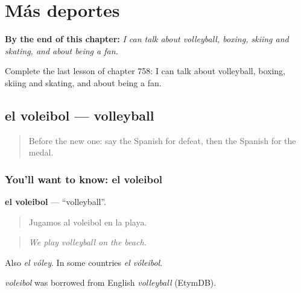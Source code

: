 
\chapter{Más deportes}
\label{ch:es-mas-deportes}

\begin{chapteropening}
\textbf{By the end of this chapter:} \emph{I can talk about volleyball, boxing, skiing and skating, and about being a fan.}

Complete the last lesson of chapter 758: I can talk about volleyball, boxing, skiing and skating, and about being a fan.
\end{chapteropening}

\section[el voleibol]{el voleibol — volleyball}

\label{lesson:ES-C758-voleibol}



\begin{quote}
Before the new one: say the Spanish for defeat, then the Spanish for the medal.
\end{quote}

\subsection*{You'll want to know: el voleibol}
\textbf{el voleibol} — \textquotedblleft{}volleyball\textquotedblright{}.

\begin{quote}
Jugamos al voleibol en la playa.
\end{quote}

\begin{quote}
\emph{We play volleyball on the beach.}
\end{quote}

Also \emph{el vóley}. In some countries \emph{el vóleibol}.

\begin{cousinweb}
\emph{voleibol} was borrowed from English \emph{volleyball} (EtymDB).
\end{cousinweb}

